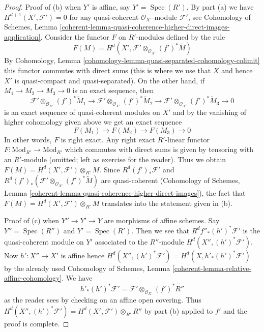 \documentclass[10pt,a4paper]{amsart}
\theoremstyle{plain}
\theoremstyle{definition}
\theoremstyle{remark}
\numberwithin{equation}{subsection}
\def\Spec{\mathop{\mathrm{Spec}}}
\begin{document}
\begin{proof}
\medskip\noindent
Proof of (b) when $Y'$ is affine, say $Y' = \Spec(R')$.
By part (a) we have $H^{d + 1}(X', \mathcal{F}') = 0$
for any quasi-coherent $\mathcal{O}_{X'}$-module $\mathcal{F}'$, see
Cohomology of Schemes, Lemma
\ref{coherent-lemma-quasi-coherence-higher-direct-images-application}.
Consider the functor $F$ on $R'$-modules defined by the rule
$$
F(M) = H^d(X', \mathcal{F}' \otimes_{\mathcal{O}_{X'}} (f')^*\widetilde{M})
$$
By Cohomology, Lemma \ref{cohomology-lemma-quasi-separated-cohomology-colimit}
this functor commutes with direct sums (this is where we use that
$X$ and hence $X'$ is quasi-compact and quasi-separated).
On the other hand, if $M_1 \to M_2 \to M_3 \to 0$ is an exact sequence,
then
$$
\mathcal{F}' \otimes_{\mathcal{O}_{X'}} (f')^*\widetilde{M}_1 \to
\mathcal{F}' \otimes_{\mathcal{O}_{X'}} (f')^*\widetilde{M}_2 \to
\mathcal{F}' \otimes_{\mathcal{O}_{X'}} (f')^*\widetilde{M}_3 \to 0
$$
is an exact sequence of quasi-coherent modules on $X'$
and by the vanishing of higher cohomology given above we get an exact sequence
$$
F(M_1) \to F(M_2) \to F(M_3) \to 0
$$
In other words, $F$ is right exact. Any right exact $R'$-linear functor
$F : \text{Mod}_{R'} \to \text{Mod}_{R'}$
which commutes with direct sums is given by tensoring with an $R'$-module
(omitted; left as exercise for the reader).
Thus we obtain $F(M) = H^d(X', \mathcal{F}') \otimes_{R'} M$.
Since $R^d(f')_*\mathcal{F}'$ and
$R^d(f')_*(\mathcal{F}' \otimes_{\mathcal{O}_{X'}} (f')^*\widetilde{M})$
are quasi-coherent (Cohomology of Schemes, Lemma
\ref{coherent-lemma-quasi-coherence-higher-direct-images}),
the fact that $F(M) = H^d(X', \mathcal{F}') \otimes_{R'} M$
translates into the statement given in (b).

\medskip\noindent
Proof of (c) when $Y'' \to Y' \to Y$ are morphisms of affine schemes.
Say $Y'' = \Spec(R'')$ and $Y' = \Spec(R')$.
Then we see that $R^df''_*(h')^*\mathcal{F}'$
is the quasi-coherent module on $Y'$ associated to the $R''$-module
$H^d(X'', (h')^*\mathcal{F}')$. Now $h' : X'' \to X'$ is affine
hence $H^d(X'', (h')^*\mathcal{F}') = H^d(X, h'_*(h')^*\mathcal{F}')$
by the already used
Cohomology of Schemes, Lemma \ref{coherent-lemma-relative-affine-cohomology}.
We have
$$
h'_*(h')^*\mathcal{F}' =
\mathcal{F}' \otimes_{\mathcal{O}_{X'}} (f')^*\widetilde{R''}
$$
as the reader sees by checking on an affine open covering. Thus
$H^d(X'', (h')^*\mathcal{F}') = H^d(X', \mathcal{F}') \otimes_{R'} R''$
by part (b) applied to $f'$ and the proof is complete.
\end{proof}
\end{document}
